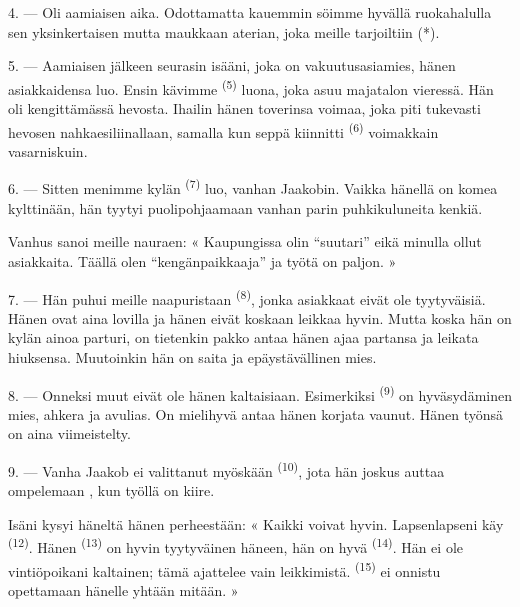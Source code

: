 4. --- Oli aamiaisen aika. Odottamatta kauemmin söimme hyvällä ruokahalulla sen
yksinkertaisen mutta maukkaan aterian, joka meille tarjoiltiin (*).

\VUsaut{3.0mm}

5. --- Aamiaisen jälkeen seurasin isääni, joka on vakuutusasiamies, hänen
asiakkaidensa luo. Ensin kävimme  \textsuperscript{(5)} luona,
joka asuu majatalon vieressä. Hän oli kengittämässä hevosta. Ihailin hänen
toverinsa voimaa, joka piti tukevasti hevosen 
nahkaesiliinallaan, samalla kun seppä kiinnitti 
\textsuperscript{(6)} voimakkain vasarniskuin.

6. --- Sitten menimme kylän  \textsuperscript{(7)} luo, vanhan
Jaakobin. Vaikka hänellä on komea  kylttinään, hän tyytyi
puolipohjaamaan vanhan parin puhkikuluneita kenkiä.

Vanhus sanoi meille nauraen: « Kaupungissa olin “suutari” eikä minulla ollut
asiakkaita. Täällä olen “kengänpaikkaaja” ja työtä on paljon. »

7. --- Hän puhui meille naapuristaan  \textsuperscript{(8)},
jonka asiakkaat eivät ole tyytyväisiä. Hänen  ovat aina
lovilla ja hänen  eivät koskaan leikkaa hyvin. Mutta koska hän
on kylän ainoa parturi, on tietenkin pakko antaa hänen ajaa partansa ja
leikata hiuksensa. Muutoinkin hän on saita ja epäystävällinen mies.

8. --- Onneksi muut  eivät ole hänen kaltaisiaan. Esimerkiksi
 \textsuperscript{(9)} on hyväsydäminen mies, ahkera ja
avulias. On mielihyvä antaa hänen korjata vaunut. Hänen työnsä on aina
viimeistelty.

9. --- Vanha Jaakob ei valittanut myöskään 
\textsuperscript{(10)}, jota hän joskus auttaa ompelemaan ,
kun työllä on kiire.

Isäni kysyi häneltä hänen perheestään: « Kaikki voivat hyvin. Lapsenlapseni käy
 \textsuperscript{(12)}. Hänen 
\textsuperscript{(13)} on hyvin tyytyväinen häneen, hän on hyvä 
\textsuperscript{(14)}. Hän ei ole vintiöpoikani kaltainen; tämä ajattelee vain
leikkimistä.  \textsuperscript{(15)} ei onnistu opettamaan
hänelle yhtään mitään. »

